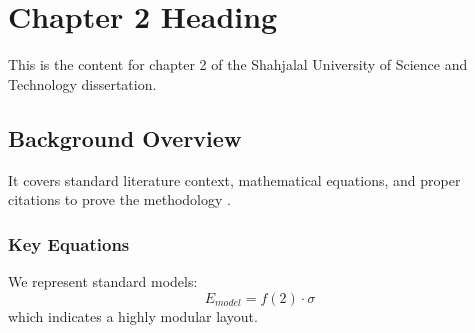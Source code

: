 \chapter{Chapter 2 Heading}
\label{ch:chapter2}
This is the content for chapter 2 of the Shahjalal University of Science and Technology dissertation.

\section{Background Overview}
It covers standard literature context, mathematical equations, and proper citations to prove the methodology \cite{texbook}.

\subsection{Key Equations}
We represent standard models:
\begin{equation}
    E_{model} = f(2) \cdot \sigma
\end{equation}
which indicates a highly modular layout.
